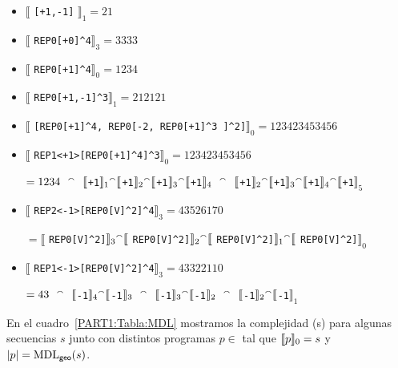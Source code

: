 \begin{itemize}
\item  $\llbracket$ \verb#[+1,-1]# $\rrbracket_1 = 21$

\item  $\llbracket$ \verb#REP0[+0]^4#$\rrbracket_3 = 3333$

\item  $\llbracket$ \verb#REP0[+1]^4#$\rrbracket_0 = 1234$

\item  $\llbracket$ \verb#REP0[+1,-1]^3#$\rrbracket_1 = 212121$

\item  $\llbracket$ \verb#[REP0[+1]^4, REP0[-2, REP0[+1]^3 ]^2]#$\rrbracket_0 = 123423453456$

\item  $\llbracket$ \verb#REP1<+1>[REP0[+1]^4]^3#$\rrbracket_0 = 123423453456$

$= 1234 \ \ \concat \ \ \llbracket$\verb#+1#$\rrbracket_1 {}^\smallfrown \llbracket$\verb#+1#$\rrbracket_2 {}^\smallfrown \llbracket$\verb#+1#$\rrbracket_3 {}^\smallfrown \llbracket$\verb#+1#$\rrbracket_4 \ \ \concat \ \ \llbracket$\verb#+1#$\rrbracket_2 {}^\smallfrown \llbracket$\verb#+1#$\rrbracket_3 {}^\smallfrown \llbracket$\verb#+1#$\rrbracket_4 {}^\smallfrown \llbracket$\verb#+1#$\rrbracket_5$

\item  $\llbracket$ \verb#REP2<-1>[REP0[V]^2]^4#$\rrbracket_3 = 43526170$ 

$= \llbracket$ \verb#REP0[V]^2]#$ \rrbracket_3 {}^\smallfrown \llbracket$ \verb#REP0[V]^2]#$ \rrbracket_2 {}^\smallfrown \llbracket$ \verb#REP0[V]^2]#$ \rrbracket_1 {}^\smallfrown \llbracket$ \verb#REP0[V]^2]#$ \rrbracket_0$

\item  $\llbracket$ \verb#REP1<-1>[REP0[V]^2]^4#$\rrbracket_3 = 43322110$

$= 43 \ \ \concat \ \ \llbracket$\verb#-1#$\rrbracket_4 {}^\smallfrown \llbracket$\verb#-1#$\rrbracket_3 \ \ \concat \ \ \llbracket$\verb#-1#$\rrbracket_3 {}^\smallfrown \llbracket$\verb#-1#$\rrbracket_2 \ \ \concat \ \ \llbracket$\verb#-1#$\rrbracket_2 {}^\smallfrown \llbracket$\verb#-1#$\rrbracket_1 $

\end{itemize}


En el cuadro~\ref{PART1:Tabla:MDL} mostramos la complejidad \mdlgeo(s) para algunas secuencias $s$ junto con distintos programas $p \in$ \gramgeo tal que $\llbracket p\rrbracket_0=s$ y $|p|={\rm MDL}_{{\sf geo}}(s) $.



